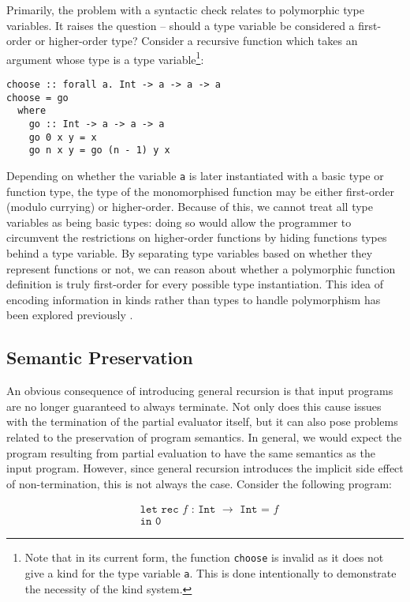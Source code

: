 \documentclass[runningheads]{llncs}
\begin{document}
Primarily, the problem with a syntactic check relates to polymorphic type variables. It raises the question -- should a type variable be considered a first-order or higher-order type? Consider a recursive function which takes an argument whose type is a type variable\footnote{Note that in its current form, the function \texttt{choose} is invalid as it does not give a kind for the type variable \texttt{a}. This is done intentionally to demonstrate the necessity of the kind system.}:

\begin{verbatim}
choose :: forall a. Int -> a -> a -> a
choose = go
  where
    go :: Int -> a -> a -> a
    go 0 x y = x
    go n x y = go (n - 1) y x
\end{verbatim}

Depending on whether the variable \texttt{a} is later instantiated with a basic type or function type, the type of the monomorphised function may be either first-order (modulo currying) or higher-order. Because of this, we cannot treat all type variables as being basic types: doing so would allow the programmer to circumvent the restrictions on higher-order functions by hiding functions types behind a type variable. By separating type variables based on whether they represent functions or not, we can reason about whether a polymorphic function definition is truly first-order for every possible type instantiation. This idea of encoding information in kinds rather than types to handle polymorphism has been explored previously \cite{downen2020kinds}.

\subsection{Semantic Preservation}

An obvious consequence of introducing general recursion is that input programs are no longer guaranteed to always terminate. Not only does this cause issues with the termination of the partial evaluator itself, but it can also pose problems related to the preservation of program semantics. In general, we would expect the program resulting from partial evaluation to have the same semantics as the input program. However, since general recursion introduces the implicit side effect of non-termination, this is not always the case. Consider the following program:

\[
  \begin{split}
    &\texttt{let rec $f$ : Int $\rightarrow$ Int = $f$} \\
    &\texttt{in 0}
  \end{split}
\]
\end{document}

